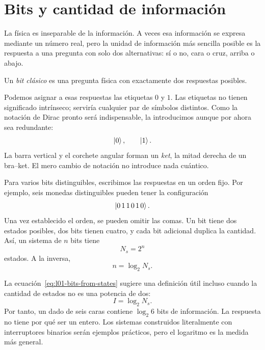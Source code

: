 \section{Bits y cantidad de información}

La física es inseparable de la información. A veces esa información se expresa mediante un número real, pero la unidad de información más sencilla posible es la respuesta a una pregunta con solo dos alternativas: sí o no, cara o cruz, arriba o abajo.

\begin{definition}Un \emph{bit clásico} es una pregunta física con exactamente dos respuestas posibles.
\end{definition}

Podemos asignar a esas respuestas las etiquetas \(0\) y \(1\). Las etiquetas no tienen significado intrínseco; serviría cualquier par de símbolos distintos. Como la notación de Dirac pronto será indispensable, la introducimos aunque por ahora sea redundante:
\begin{equation}
  \left\lvert0\right\rangle,
  \qquad
  \left\lvert1\right\rangle.
\end{equation}
La barra vertical y el corchete angular forman un \emph{ket}, la mitad derecha de un bra--ket. El mero cambio de notación no introduce nada cuántico.

Para varios bits distinguibles, escribimos las respuestas en un orden fijo. Por ejemplo, seis monedas distinguibles pueden tener la configuración
\begin{equation}
  \left\lvert0\,1\,1\,0\,1\,0\right\rangle.
\end{equation}
Una vez establecido el orden, se pueden omitir las comas. Un bit tiene dos estados posibles, dos bits tienen cuatro, y cada bit adicional duplica la cantidad. Así, un sistema de \(n\) bits tiene
\begin{equation}
  N_s=2^n
  \label{eq:l01-state-count}
\end{equation}
estados. A la inversa,
\begin{equation}
  n=\log_2 N_s.
  \label{eq:l01-bits-from-states}
\end{equation}

La ecuación~\eqref{eq:l01-bits-from-states} sugiere una definición útil incluso cuando la cantidad de estados no es una potencia de dos:
\begin{equation}
  I=\log_2 N_s.
  \label{eq:l01-information}
\end{equation}
Por tanto, un dado de seis caras contiene \(\log_2 6\) bits de información. La respuesta no tiene por qué ser un entero. Los sistemas construidos literalmente con interruptores binarios serán ejemplos prácticos, pero el logaritmo es la medida más general.

